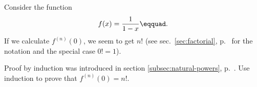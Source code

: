 Consider the function 
\begin{equation*}
  f(x) = \frac{1}{1-x}\eqquad.
\end{equation*}
If we calculate $f^{(n)}(0)$, we seem to get $n!$
(see sec.~\ref{sec:factorial}, p.~\pageref{sec:factorial} for the notation
and the special case $0!=1$).

Proof by induction was introduced in section \ref{subsec:natural-powers}, p.~\pageref{induction}.
Use induction to prove that $f^{(n)}(0)=n!$.
